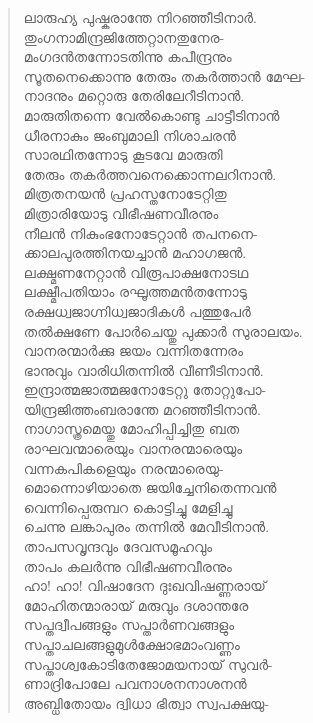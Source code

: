 \begin{verse}
ലാരുഹ്യ പുഷ്കരാന്തേ നിറഞ്ഞീടിനാര്‍.\\
തുംഗനാമിന്ദ്രജിത്തേറ്റാനതുനേര-\\
മംഗദന്‍തന്നോടതിന്നു കപീന്ദ്രനും\\
സൂതനെക്കൊന്നു തേരും തകര്‍ത്താന്‍ മേഘ-\\
നാദനും മറ്റൊരു തേരിലേറീടിനാന്‍.\\
മാരുതിതന്നെ വേല്‍കൊണ്ടു ചാട്ടീടിനാന്‍\\
ധീരനാകും ജംബുമാലി നിശാചരന്‍\\
സാരഥിതന്നോടു കൂടവേ മാരുതി\\
തേരും തകര്‍ത്തവനെക്കൊന്നലറിനാന്‍.\\
മിത്രതനയന്‍ പ്രഹസ്തനോടേറ്റിതു\\
മിത്രാരിയോടു വിഭീഷണവീരനും\\
നീലന്‍ നികുംഭനോടേറ്റാന്‍ തപനനെ-\\
ക്കാലപുരത്തിനയച്ചാന്‍ മഹാഗജന്‍.\\
ലക്ഷ്മണനേറ്റാന്‍ വിരൂപാക്ഷനോടഥ\\
ലക്ഷ്മീപതിയാം രഘൂത്തമന്‍തന്നോടു\\
രക്ഷധ്വജാഗ്നിധ്വജാദികള്‍ പത്തുപേര്‍\\
തല്‍ക്ഷണേ പോര്‍ചെയ്തു പുക്കാര്‍ സുരാലയം.\\
വാനരന്മാര്‍ക്കു ജയം വന്നിതന്നേരം\\
ഭാനുവും വാരിധിതന്നില്‍ വീണീടിനാന്‍.\\
ഇന്ദ്രാത്മജാത്മജനോടേറ്റു തോറ്റുപോ-\\
യിന്ദ്രജിത്തംബരാന്തേ മറഞ്ഞീടിനാന്‍.\\
നാഗാസ്ത്രമെയ്തു മോഹിപ്പിച്ചിതു ബത\\
രാഘവന്മാരെയും വാനരന്മാരെയും\\
വന്നകപികളെയും നരന്മാരെയു-\\
മൊന്നൊഴിയാതെ ജയിച്ചേനിതെന്നവന്‍\\
വെന്നിപ്പെരുമ്പറ കൊട്ടിച്ചു മേളിച്ചു\\
ചെന്നു ലങ്കാപുരം തന്നില്‍ മേവീടിനാന്‍.\\
താപസവൃന്ദവും ദേവസമൂഹവും\\
താപം കലര്‍ന്നു വിഭീഷണവീരനും\\
ഹാ! ഹാ! വിഷാദേന ദുഃഖവിഷണ്ണരായ്\\
മോഹിതന്മാരായ് മരുവും ദശാന്തരേ\\
സപ്തദ്വീപങ്ങളും സപ്താര്‍ണവങ്ങളും\\
സപ്താചലങ്ങളുമുള്‍ക്ഷോഭമാംവണ്ണം\\
സപ്താശ്വകോടിതേജോമയനായ് സുവര്‍-\\
ണാദ്രിപോലേ പവനാശനനാശനന്‍\\
അബ്ധിതോയം ദ്വിധാ ഭിത്വാ സ്വപക്ഷയു-\\

\end{verse}
